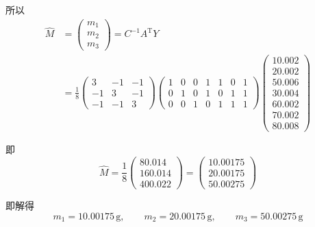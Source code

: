 \documentclass[UTF8,zihao=-4]{ctexart}
\begin{document}
所以
\begin{equation*}
\begin{aligned}
    \hat{M}
    &=
    \begin{pmatrix}
        m_1\\
        m_2\\
        m_3
    \end{pmatrix}
    =
    C^{-1}A^{\mathrm{T}}Y\\
    &=
    \frac{1}{8}
    \begin{pmatrix}
        3 & -1 & -1\\
        -1 & 3 & -1\\
        -1 & -1 & 3
    \end{pmatrix}
    \begin{pmatrix}
        1 & 0 & 0 & 1 & 1 & 0 & 1\\
        0 & 1 & 0 & 1 & 0 & 1 & 1\\
        0 & 0 & 1 & 0 & 1 & 1 & 1
    \end{pmatrix}
    \begin{pmatrix}
        10.002\\
        20.002\\
        50.006\\
        30.004\\
        60.002\\
        70.002\\
        80.008
    \end{pmatrix}
\end{aligned}
\end{equation*}

即
\begin{equation*}
    \hat{M}
    =
    \frac{1}{8}
    \begin{pmatrix}
        80.014\\
        160.014\\
        400.022
    \end{pmatrix}
    =
    \begin{pmatrix}
        10.00175\\
        20.00175\\
        50.00275
    \end{pmatrix}
\end{equation*}

即解得
\begin{equation*}
    m_1=10.00175\,\mathrm{g},
    \qquad
    m_2=20.00175\,\mathrm{g},
    \qquad
    m_3=50.00275\,\mathrm{g}
\end{equation*}
\end{document}
